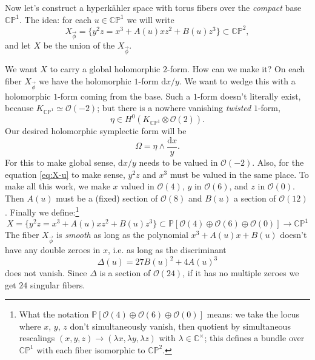 \documentclass[12pt,letterpaper,reqno]{article}
\numberwithin{equation}{section}
\newcommand{\cO}{\ensuremath{\mathcal O}}
\newcommand{\C}{\ensuremath{\mathbb C}}
\newcommand{\PP}{\ensuremath{\mathbb P}}
\newcommand{\hk}{hyperk\"ahler\xspace}
\newcommand{\de}{\mathrm{d}}
\newcommand{\ti}[1]{\textit{#1}}
\begin{document}
\begin{example} \label{exa:elliptically-fibered-k3}
Now let's construct a \hk space with torus fibers over the \ti{compact}
base $\C\PP^1$. The idea: for each $u \in \C\PP^1$ we will write
\begin{equation} \label{eq:X-u}
  X_{\vec \phi} = \{ y^2 z = x^3 + A(u) xz^2 + B(u) z^3 \} \subset \C\PP^2,
\end{equation}
and let $X$ be the union of the $X_{\vec \phi}$.

We want $X$ to carry a global holomorphic $2$-form. How can we make it?
On each fiber $X_{\vec \phi}$ we have the holomorphic $1$-form $\de x / y$. 
We want to wedge this with
a holomorphic $1$-form coming from the base. Such a $1$-form 
doesn't literally exist, because $K_{\C\PP^1} \simeq \cO(-2)$; but there is
a nowhere vanishing \ti{twisted} $1$-form,
\begin{equation}
  \eta \in H^0(K_{\C\PP^1} \otimes \cO(2)).
\end{equation}
Our desired holomorphic symplectic form will be
\begin{equation}
  \Omega = \eta \wedge \frac{\de x}{y}.
\end{equation}
For this to make global sense, $\de x/y$ needs to be
valued in $\cO(-2)$. Also, for the equation \eqref{eq:X-u}
to make sense, $y^2 z$ and $x^3$ must be valued in the same place.
To make all this work, we make $x$ valued in $\cO(4)$, $y$ in $\cO(6)$,
and $z$ in $\cO(0)$. Then $A(u)$ must be a (fixed) section of $\cO(8)$
and $B(u)$ a section of $\cO(12)$.
Finally we define:\footnote{What the notation $\PP[\cO(4) \oplus \cO(6) \oplus \cO(0)]$ means: we take the locus where $x$, $y$, $z$ don't 
simultaneously vanish, then quotient by simultaneous rescalings 
$(x,y,z) \to (\lambda x, \lambda y, \lambda z)$ with $\lambda \in \C^\times$; 
this defines a bundle over $\C\PP^1$ with each fiber isomorphic to $\C\PP^2$.}
\begin{equation}
  X = \{ y^2 z = x^3 + A(u) xz^2 + B(u) z^3 \} \subset \PP[\cO(4) \oplus \cO(6) \oplus \cO(0)] \to \C\PP^1
\end{equation}
The fiber $X_{\vec \phi}$ is \ti{smooth} as long as the polynomial
$x^3 + A(u) x + B(u)$ doesn't have any double zeroes in $x$,
i.e. as long as the discriminant
\begin{equation}
  \Delta(u) = 27 B(u)^2 + 4 A(u)^3
\end{equation}
does not vanish. Since $\Delta$ is a section of $\cO(24)$,
if it has no multiple zeroes we get $24$ singular fibers. 

\end{example}
\end{document}
